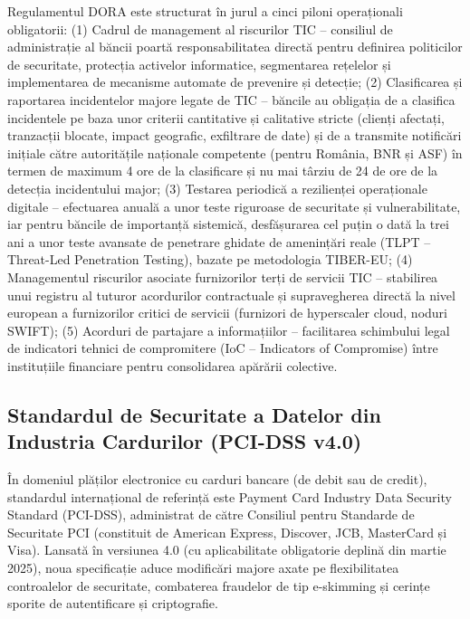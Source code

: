 Regulamentul DORA este structurat în jurul a cinci piloni operaționali obligatorii: (1) Cadrul de management al riscurilor TIC – consiliul de administrație al băncii poartă responsabilitatea directă pentru definirea politicilor de securitate, protecția activelor informatice, segmentarea rețelelor și implementarea de mecanisme automate de prevenire și detecție; (2) Clasificarea și raportarea incidentelor majore legate de TIC – băncile au obligația de a clasifica incidentele pe baza unor criterii cantitative și calitative stricte (clienți afectați, tranzacții blocate, impact geografic, exfiltrare de date) și de a transmite notificări inițiale către autoritățile naționale competente (pentru România, BNR și ASF) în termen de maximum 4 ore de la clasificare și nu mai târziu de 24 de ore de la detecția incidentului major; (3) Testarea periodică a rezilienței operaționale digitale – efectuarea anuală a unor teste riguroase de securitate și vulnerabilitate, iar pentru băncile de importanță sistemică, desfășurarea cel puțin o dată la trei ani a unor teste avansate de penetrare ghidate de amenințări reale (TLPT – Threat-Led Penetration Testing), bazate pe metodologia TIBER-EU; (4) Managementul riscurilor asociate furnizorilor terți de servicii TIC – stabilirea unui registru al tuturor acordurilor contractuale și supravegherea directă la nivel european a furnizorilor critici de servicii (furnizori de hyperscaler cloud, noduri SWIFT); (5) Acorduri de partajare a informațiilor – facilitarea schimbului legal de indicatori tehnici de compromitere (IoC – Indicators of Compromise) între instituțiile financiare pentru consolidarea apărării colective.

\subsection{Standardul de Securitate a Datelor din Industria Cardurilor (PCI-DSS v4.0)}

În domeniul plăților electronice cu carduri bancare (de debit sau de credit), standardul internațional de referință este Payment Card Industry Data Security Standard (PCI-DSS), administrat de către Consiliul pentru Standarde de Securitate PCI (constituit de American Express, Discover, JCB, MasterCard și Visa). Lansată în versiunea 4.0 (cu aplicabilitate obligatorie deplină din martie 2025), noua specificație aduce modificări majore axate pe flexibilitatea controalelor de securitate, combaterea fraudelor de tip e-skimming și cerințe sporite de autentificare și criptografie.

